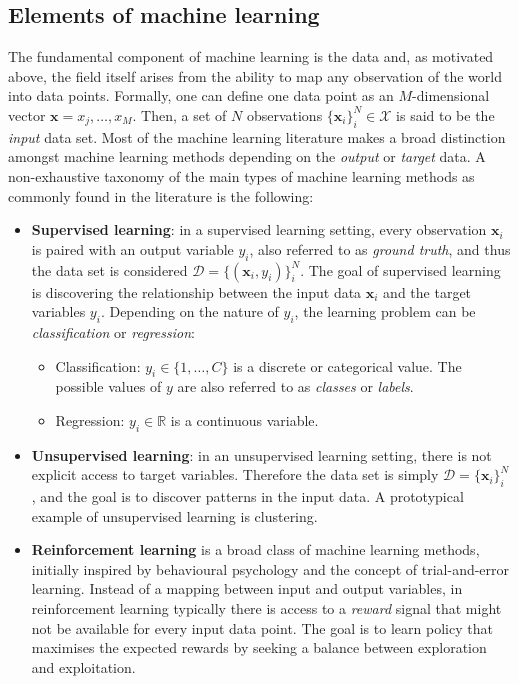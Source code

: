 {\subsection{Elements of machine learning}
\label{sec:background-elements_ml}
The fundamental component of machine learning is the data and, as motivated above, the field itself arises from the ability to map any observation of the world into data points. Formally, one can define one data point as an $M$-dimensional vector $\mathbf{x} = x_{j}, \ldots, x_{M}$. Then, a set of $N$ observations $\{\mathbf{x}_{i}\}_{i}^{N} \in \mathcal{X}$ is said to be the \textit{input} data set. Most of the machine learning literature \citep{alpaydin2009machinelearning, abu2012learningfromdata, murphy2012machinelearning} makes a broad distinction amongst machine learning methods depending on the \textit{output} or \textit{target} data. A non-exhaustive taxonomy of the main types of machine learning methods as commonly found in the literature is the following:

\begin{itemize}
  \item \textbf{Supervised learning}: in a supervised learning setting, every observation $\mathbf{x}_{i}$ is paired with an output variable $y_{i}$, also referred to as \textit{ground truth}, and thus the data set is considered $\mathcal{D} = \{(\mathbf{x}_{i}, y_{i})\}_{i}^{N}$. The goal of supervised learning is discovering the relationship between the input data $\mathbf{x}_{i}$ and the target variables $y_{i}$. Depending on the nature of $y_{i}$, the learning problem can be \textit{classification} or \textit{regression}:
  \begin{itemize}
    \item Classification: $y_{i} \in \{1, \ldots, C\}$ is a discrete or categorical value. The possible values of $y$ are also referred to as \textit{classes} or \textit{labels}.
    \item Regression: $y_{i} \in \mathbb{R}$ is a continuous variable.
  \end{itemize}
  \item \textbf{Unsupervised learning}: in an unsupervised learning setting, there is not explicit access to target variables. Therefore the data set is simply $\mathcal{D} = \{\mathbf{x}_{i}\}_{i}^{N}$, and the goal is to discover patterns in the input data. A prototypical example of unsupervised learning is clustering.
  \item \textbf{Reinforcement learning} is a broad class of machine learning methods, initially inspired by behavioural psychology and the concept of trial-and-error learning. Instead of a mapping between input and output variables, in reinforcement learning typically there is access to a \textit{reward} signal that might not be available for every input data point. The goal is to learn policy that maximises the expected rewards by seeking a balance between exploration and exploitation.
\end{itemize}

}
